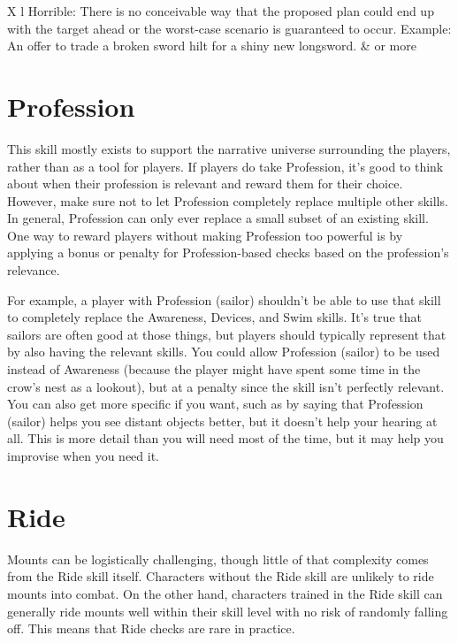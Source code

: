 \begin{dtable}
\begin{dtabularx}{\columnwidth}{X l}
                Horrible: There is no conceivable way that the proposed plan could end up with the target ahead or the worst-case scenario is guaranteed to occur. Example: An offer to trade a broken sword hilt for a shiny new longsword.                                                                                      &  or more                                                    \\
            \end{dtabularx}
        \end{dtable}

\section{Profession}
    This skill mostly exists to support the narrative universe surrounding the players, rather than as a tool for players.
    If players do take Profession, it's good to think about when their profession is relevant and reward them for their choice.
    However, make sure not to let Profession completely replace multiple other skills.
    In general, Profession can only ever replace a small subset of an existing skill.
    One way to reward players without making Profession too powerful is by applying a bonus or penalty for Profession-based checks based on the profession's relevance.

    For example, a player with Profession (sailor) shouldn't be able to use that skill to completely replace the Awareness, Devices, and Swim skills.
    It's true that sailors are often good at those things, but players should typically represent that by also having the relevant skills.
    You could allow Profession (sailor) to be used instead of Awareness (because the player might have spent some time in the crow's nest as a lookout), but at a penalty since the skill isn't perfectly relevant.
    You can also get more specific if you want, such as by saying that Profession (sailor) helps you see distant objects better, but it doesn't help your hearing at all.
    This is more detail than you will need most of the time, but it may help you improvise when you need it.

\section{Ride}
    Mounts can be logistically challenging, though little of that complexity comes from the Ride skill itself.
    Characters without the Ride skill are unlikely to ride mounts into combat.
    On the other hand, characters trained in the Ride skill can generally ride mounts well within their skill level with no risk of randomly falling off.
    This means that Ride checks are rare in practice.

